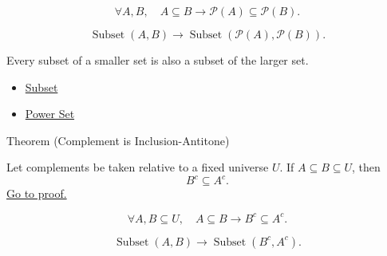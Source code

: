 
\begin{remark*}
\[
  \forall A,B,\quad A\subseteq B\to \mathcal{P}(A)\subseteq\mathcal{P}(B).
\]
\end{remark*}

\begin{remark*}
\[
  \operatorname{Subset}(A,B)
  \to
  \operatorname{Subset}(\mathcal{P}(A),\mathcal{P}(B)).
\]
\end{remark*}

\begin{remark*}[Interpretation]
Every subset of a smaller set is also a subset of the larger set.
\end{remark*}

\begin{dependencies}
\begin{itemize}
  \item \hyperref[def:subset]{Subset}
  \item \hyperref[def:power-set]{Power Set}
\end{itemize}
\end{dependencies}

\begin{theorembox}{Theorem (Complement is Inclusion-Antitone)}
\begin{theorem}\label{thm:complement-antitone-inclusion}
Let complements be taken relative to a fixed universe $U$. If
$A\subseteq B\subseteq U$, then
\[
B^c\subseteq A^c.
\]
\hyperref[prf:complement-antitone-inclusion]{Go to proof.}
\end{theorem}
\end{theorembox}


\begin{remark*}
\[
  \forall A,B\subseteq U,\quad A\subseteq B\to B^c\subseteq A^c.
\]
\end{remark*}

\begin{remark*}
\[
  \operatorname{Subset}(A,B)
  \to
  \operatorname{Subset}(B^c,A^c).
\]
\end{remark*}

